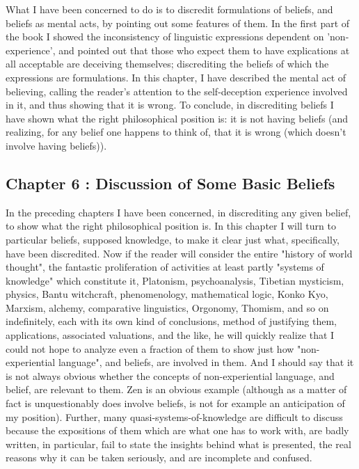 \documentclass[10pt,twoside,draft]{memoir}
\begin{document}
{What I have been concerned to do is to discredit formulations of 
beliefs, and beliefs as mental acts, by pointing out some features of them. In 
the first part of the book I showed the inconsistency of linguistic expressions 
dependent on 'non-experience', and pointed out that those who expect them 
to have explications at all acceptable are deceiving themselves; discrediting 
the beliefs of which the expressions are formulations. In this chapter, I have 
described the mental act of believing, calling the reader's attention to the 
self-deception experience involved in it, and thus showing that it is wrong. 
To conclude, in discrediting beliefs I have shown what the right 
philosophical position is: it is not having beliefs (and realizing, for any belief 
one happens to think of, that it is wrong (which doesn't involve having beliefs)). 

\subsection*{Chapter 6 : Discussion of Some Basic Beliefs}

In the preceding chapters I have been concerned, in discrediting any 
given belief, to show what the right philosophical position is. In this chapter 
I will turn to particular beliefs, supposed knowledge, to make it clear just 
what, specifically, have been discredited. Now if the reader will consider the 
entire "history of world thought", the fantastic proliferation of activities at 
least partly "systems of knowledge" which constitute it, Platonism, 
psychoanalysis, Tibetian mysticism, physics, Bantu witchcraft, 
phenomenology, mathematical logic, Konko Kyo, Marxism, alchemy, 
comparative linguistics, Orgonomy, Thomism, and so on indefinitely, each 
with its own kind of conclusions, method of justifying them, applications, 
associated valuations, and the like, he will quickly realize that I could not 
hope to analyze even a fraction of them to show just how "non-experiential 
language", and beliefs, are involved in them. And I should say that it is not 
always obvious whether the concepts of non-experiential language, and 
belief, are relevant to them. Zen is an obvious example (although as a matter 
of fact is unquestionably does involve beliefs, is not for example an 
anticipation of my position). Further, many quasi-systems-of-knowledge are 
difficult to discuss because the expositions of them which are what one has 
to work with, are badly written, in particular, fail to state the insights behind 
what is presented, the real reasons why it can be taken seriously, and are 
incomplete and confused. 

}
\end{document}
